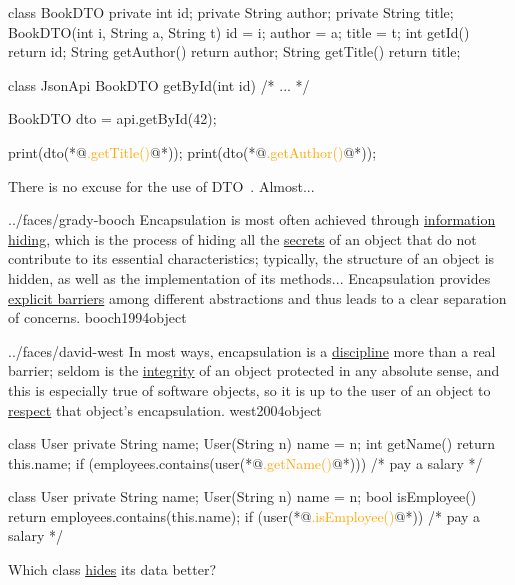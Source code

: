 \documentclass{article}
\begin{document}
\begin{pptWide}{2}
{\small\begin{ffcode}
class BookDTO {
  private int id;
  private String author;
  private String title;
  BookDTO(int i, String a, String t)
    { id = i; author = a; title = t; }
  int getId() { return id; }
  String getAuthor() { return author; }
  String getTitle() { return title; }
}
\end{ffcode}
}
\par\columnbreak\par
{\small\begin{ffcode}
class JsonApi {
  BookDTO getById(int id) { /* ... */ }
}

BookDTO dto = api.getById(42);

print(dto(*@\textcolor{orange}{.getTitle()}@*));
print(dto(*@\textcolor{orange}{.getAuthor()}@*));
\end{ffcode}
}
\end{pptWide}
\par
There is no excuse for the use of DTO~\citep{bugayenko2016blog0706}. Almost...
\plush{}


\lnQuote
  {../faces/grady-booch}
  {Encapsulation is most often achieved through \ul{information hiding}, which is the process of hiding all the \ul{secrets} of an object that do not contribute to its essential characteristics; typically, the structure of an object is hidden, as well as the implementation of its methods... Encapsulation provides \ul{explicit barriers} among different abstractions and thus leads to a clear separation of concerns.}
  {booch1994object}

\lnQuote
  {../faces/david-west}
  {In most ways, encapsulation is a \ul{discipline} more than a real barrier; seldom is the \ul{integrity} of an object protected in any absolute sense, and this is especially true of software objects, so it is up to the user of an object to \ul{respect} that object's encapsulation.}
  {west2004object}

\begin{pptWide}{2}
{\small\begin{ffcode}
class User {
  private String name;
  User(String n) { name = n; }
  int getName() {
    return this.name;
  }
}
if (employees.contains(user(*@\textcolor{orange}{.getName()}@*))) {
  /* pay a salary */
}
\end{ffcode}
}
\par\columnbreak\par
{\small\begin{ffcode}
class User {
  private String name;
  User(String n) { name = n; }
  bool isEmployee() {
    return employees.contains(this.name);
  }
}
if (user(*@\textcolor{orange}{.isEmployee()}@*)) {
  /* pay a salary */
}
\end{ffcode}
}
\end{pptWide}
\par
Which class \ul{hides} its data better?
\plush{}
\end{document}
